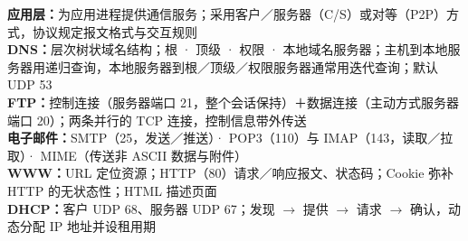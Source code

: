 \documentclass[a4paper,11pt]{article}
\begin{document}

\begin{knowmap}
\textbf{应用层：}为应用进程提供通信服务；采用客户／服务器（C/S）或对等（P2P）方式，协议规定报文格式与交互规则\\[2pt]
\textbf{DNS：}层次树状域名结构；根 · 顶级 · 权限 · 本地域名服务器；主机到本地服务器用递归查询，本地服务器到根／顶级／权限服务器通常用迭代查询；默认 UDP 53\\[2pt]
\textbf{FTP：}控制连接（服务器端口 21，整个会话保持）＋数据连接（主动方式服务器端口 20）；两条并行的 TCP 连接，控制信息带外传送\\[2pt]
\textbf{电子邮件：}SMTP（25，发送／推送）· POP3（110）与 IMAP（143，读取／拉取）· MIME（传送非 ASCII 数据与附件）\\[2pt]
\textbf{WWW：}URL 定位资源；HTTP（80）请求／响应报文、状态码；Cookie 弥补 HTTP 的无状态性；HTML 描述页面\\[2pt]
\textbf{DHCP：}客户 UDP 68、服务器 UDP 67；发现 $\rightarrow$ 提供 $\rightarrow$ 请求 $\rightarrow$ 确认，动态分配 IP 地址并设租用期
\end{knowmap}
\end{document}
